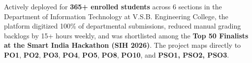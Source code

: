{Actively deployed for \textbf{365+ enrolled students} across 6 sections in the Department of Information Technology at V.S.B. Engineering College, the platform digitized 100\% of departmental submissions, reduced manual grading backlogs by 15+ hours weekly, and was shortlisted among the \textbf{Top 50 Finalists at the Smart India Hackathon (SIH 2026)}. The project maps directly to \textbf{PO1}, \textbf{PO2}, \textbf{PO3}, \textbf{PO4}, \textbf{PO5}, \textbf{PO8}, \textbf{PO10}, and \textbf{PSO1, PSO2, PSO3}.\par}
\newpage
